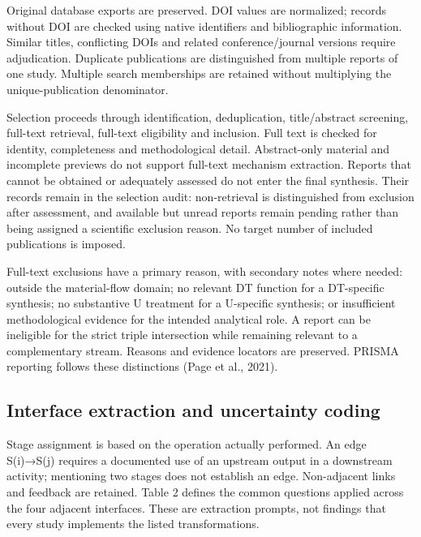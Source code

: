 Original database exports are preserved. DOI values are normalized; records without DOI are checked using native identifiers and bibliographic information. Similar titles, conflicting DOIs and related conference/journal versions require adjudication. Duplicate publications are distinguished from multiple reports of one study. Multiple search memberships are retained without multiplying the unique-publication denominator.

Selection proceeds through identification, deduplication, title/abstract screening, full-text retrieval, full-text eligibility and inclusion. Full text is checked for identity, completeness and methodological detail. Abstract-only material and incomplete previews do not support full-text mechanism extraction. Reports that cannot be obtained or adequately assessed do not enter the final synthesis. Their records remain in the selection audit: non-retrieval is distinguished from exclusion after assessment, and available but unread reports remain pending rather than being assigned a scientific exclusion reason. No target number of included publications is imposed.

Full-text exclusions have a primary reason, with secondary notes where needed: outside the material-flow domain; no relevant DT function for a DT-specific synthesis; no substantive U treatment for a U-specific synthesis; or insufficient methodological evidence for the intended analytical role. A report can be ineligible for the strict triple intersection while remaining relevant to a complementary stream. Reasons and evidence locators are preserved. PRISMA reporting follows these distinctions (Page et al., 2021).


\subsection{Interface extraction and uncertainty coding}
Stage assignment is based on the operation actually performed. An edge S(i)→S(j) requires a documented use of an upstream output in a downstream activity; mentioning two stages does not establish an edge. Non-adjacent links and feedback are retained. Table 2 defines the common questions applied across the four adjacent interfaces. These are extraction prompts, not findings that every study implements the listed transformations.

